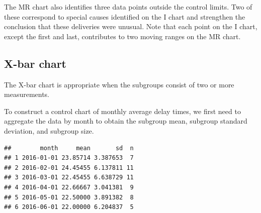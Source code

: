 \documentclass[
]{book}
\newenvironment{Shaded}{\begin{snugshade}}{\end{snugshade}}
\newcommand{\AttributeTok}[1]{\textcolor[rgb]{0.13,0.29,0.53}{#1}}
\newcommand{\CommentTok}[1]{\textcolor[rgb]{0.56,0.35,0.01}{\textit{#1}}}
\newcommand{\ConstantTok}[1]{\textcolor[rgb]{0.56,0.35,0.01}{#1}}
\newcommand{\ControlFlowTok}[1]{\textcolor[rgb]{0.13,0.29,0.53}{\textbf{#1}}}
\newcommand{\DecValTok}[1]{\textcolor[rgb]{0.00,0.00,0.81}{#1}}
\newcommand{\FunctionTok}[1]{\textcolor[rgb]{0.13,0.29,0.53}{\textbf{#1}}}
\newcommand{\NormalTok}[1]{#1}
\newcommand{\OtherTok}[1]{\textcolor[rgb]{0.56,0.35,0.01}{#1}}
\newcommand{\SpecialCharTok}[1]{\textcolor[rgb]{0.81,0.36,0.00}{\textbf{#1}}}
\begin{document}
The MR chart also identifies three data points outside the control
limits. Two of these correspond to special causes identified on the I
chart and strengthen the conclusion that these deliveries were unusual.
Note that each point on the I chart, except the first and last,
contributes to two moving ranges on the MR chart.

\subsection{X-bar chart}\label{x-bar-chart}

The X-bar chart is appropriate when the subgroups consist of two or more
measurements.

To construct a control chart of monthly average delay times, we first
need to aggregate the data by month to obtain the subgroup mean,
subgroup standard deviation, and subgroup size.

\begin{Shaded}
\end{Shaded}

\begin{verbatim}
##        month     mean       sd  n
## 1 2016-01-01 23.85714 3.387653  7
## 2 2016-02-01 24.45455 6.137811 11
## 3 2016-03-01 22.45455 6.638729 11
## 4 2016-04-01 22.66667 3.041381  9
## 5 2016-05-01 22.50000 3.891382  8
## 6 2016-06-01 22.00000 6.204837  5
\end{verbatim}
\end{document}
